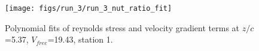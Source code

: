\begin{figure}[H]
\centering
\texttt{[image: figs/run\_3/run\_3\_nut\_ratio\_fit]}
\caption{Polynomial fits of reynolds stress and velocity gradient terms at $z/c$=5.37, $V_{free}$=19.43, station 1.}
\label{fig:run_3_nut_ratio_fit}
\end{figure}



